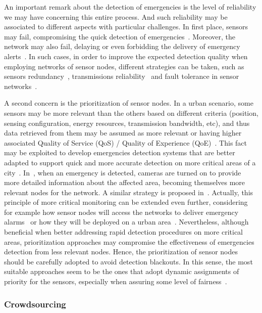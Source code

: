 \begin{refsection}
An important remark about the detection of emergencies is the level of reliability we may have concerning this entire process. And such reliability may be associated to different aspects with particular challenges. In first place, sensors may fail, compromising the quick detection of emergencies~\cite{availability1,availability2}. Moreover, the network may also fail, delaying or even forbidding the delivery of emergency alerts~\cite{networking1,networking2}.
In such cases, in order to improve the expected detection quality when employing networks of sensor nodes, different strategies can be taken, such as sensors redundancy~\cite{redundancy2}, transmissions reliability~\cite{reliability1} and fault tolerance in sensor networks~\cite{redundancy1}. 

A second concern is the prioritization of sensor nodes. In a urban scenario, some sensors may be more relevant than the others based on different criteria (position, sensing configuration, energy resources, transmission bandwidth, etc), and thus data retrieved from them may be assumed as more relevant or having higher associated Quality of Service (QoS) / Quality of Experience (QoE)~\cite{smartcities3,priority1,qoe1}. This fact may be exploited to develop emergencies detection systems that are better adapted to support quick and more accurate detection on more critical areas of a city~\cite{priority4}. In~\cite{priority2}, when an emergency is detected, cameras are turned on to provide more detailed information about the affected area, becoming themselves more relevant nodes for the network. A similar strategy is proposed in~\cite{priority3}. Actually, this principle of more critical monitoring can be extended even further, considering for example how sensor nodes will access the networks to deliver emergency alarms~\cite{qosnetworks1} or how they will be deployed on a urban area~\cite{deployment1}. Nevertheless, although beneficial when better addressing rapid detection procedures on more critical areas, prioritization approaches may compromise the effectiveness of emergencies detection from less relevant nodes. Hence, the prioritization of sensor nodes should be carefully adopted to avoid detection blackouts. In this sense, the most suitable approaches seem to be the ones that adopt dynamic assignments of priority for the sensors, especially when assuring some level of fairness~\cite{smartcities3}.   

\subsubsection{Crowdsourcing}


\end{refsection}
